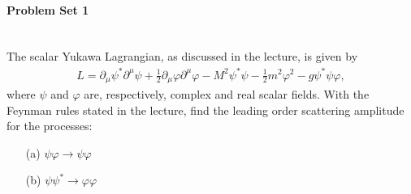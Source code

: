 \paragraph*{Problem Set 1} %
\\
The scalar Yukawa Lagrangian, as discussed in the lecture, is given by
\begin{align}
    L = \partial_\mu \psi^* \partial^\mu \psi + \frac{1}{2} \partial_\mu \varphi \partial^\mu \varphi - M^2 \psi^* \psi - \frac{1}{2} m^2 \varphi^2 - g \psi^* \psi \varphi,
\end{align}
where $\psi$ and $\varphi$ are, respectively, complex and real scalar fields. With the Feynman rules stated in the lecture, find the leading order scattering amplitude for the processes:
\begin{itemize}
    \item[(a)] $\psi \varphi \rightarrow \psi \varphi$
    \item[(b)] $\psi \psi^* \rightarrow \varphi \varphi$
\end{itemize}
\bigskip\bigskip\hline\hline\bigskip
